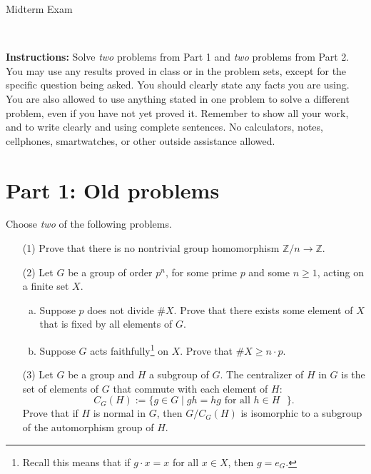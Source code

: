 \documentclass[11pt]{article}
\title{}
\date{\vspace{-0.5in}}
\newcommand{\Z}{\mathbb{Z}}
\theoremstyle{definition}
\begin{document}
\thispagestyle{fancy}
\pagestyle{fancy}

\vspace{3em}

\begin{center}
	{\LARGE Midterm Exam}
\end{center}

\

\noindent
{\bf Instructions:}
Solve \emph{two} problems from Part 1 and \emph{two} problems from Part 2. You may use any results proved in class or in the problem sets, except for the specific question being asked. You should clearly state any facts you are using. You are also allowed to use anything stated in
one problem to solve a different problem, even if you have not yet proved it. Remember to show
all your work, and to write clearly and using complete sentences. No calculators, notes, cellphones,
smartwatches, or other outside assistance allowed.

\section*{Part 1: Old problems}

Choose \emph{two} of the following problems.

\begin{enumerate}
 
 \item[(1)] Prove that there is no nontrivial group homomorphism $\Z/n \to \Z$.
 
 
  \item[(2)] Let $G$ be a group of order $p^n$, for some prime $p$ and some $n\geq 1$, acting on a finite set $X$.
  \begin{enumerate}[(a)]
    \item Suppose $p$ does not divide $\# X$. Prove that there exists some element of $X$ that is fixed by all elements of $G$.
      \item Suppose $G$ acts faithfully\footnote{Recall this means that if $g \cdot x = x$ for all $x \in X$, then $g = e_G$.} on $X$.  Prove that $\# X \geq n \cdot p$.
            \end{enumerate}
            
            
 \item[(3)] Let $G$ be a group and $H$ a subgroup of $G$. The centralizer of $H$ in $G$ is the set of elements of $G$ that commute with each element of $H$:
  $$
  C_G(H) := \{g \in G \mid gh = hg \text{ for all $h \in H$ }\}.
  $$
  Prove that if $H$ is normal in $G$, then $G/C_G(H)$ is isomorphic to a subgroup of the automorphism group of $H$.
 
 


     
    


 \end{enumerate}
\end{document}
